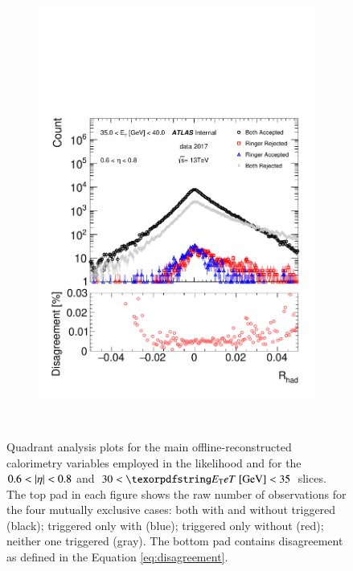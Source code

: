 \begin{figure}[h!]
\begin{subfigure}[c]{.49\textwidth}
\includegraphics[width=\textwidth]{sections/04_analysis/figures/quadrant_plots/rhad.pdf}
\caption{}
\end{subfigure} \\


\caption{\label{fig:quadrant_calo_variables_30GeV}
	Quadrant analysis plots for the main offline-reconstructed
	calorimetry variables employed in the
	likelihood and for the $0.6<\abseta{}<0.8$ and
	$30<\et{}~[\text{GeV}]<35$ slices. 
	The top pad in each figure shows the raw number of observations for the four mutually exclusive cases: both with and without \rnn{}
	triggered (black); triggered only with \rnn{} (blue); triggered only without \rnn{} (red); neither one triggered (gray). The bottom pad contains disagreement as defined in the Equation \eqref{eq:disagreement}.
}
\end{figure}

